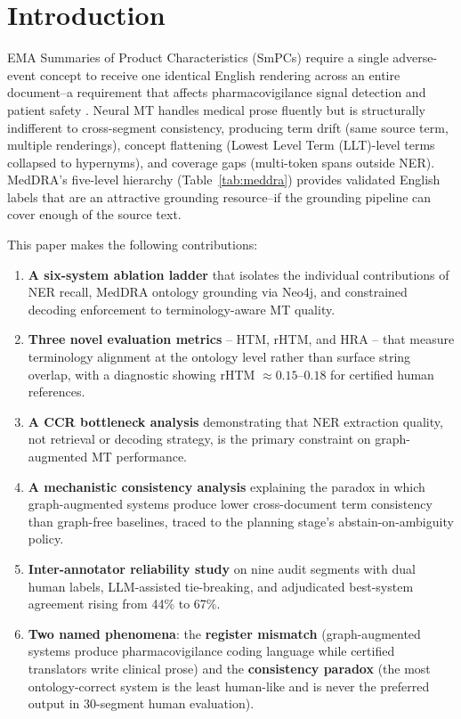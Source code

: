 \documentclass[11pt,a4paper,twocolumn]{article}
\begin{document}
\section{Introduction}
\label{sec:intro}

EMA Summaries of Product Characteristics (SmPCs) require a single
adverse-event concept to receive one identical English rendering across an
entire document--a requirement that affects pharmacovigilance signal detection
and patient safety \citep{neves2022evaluation}. Neural MT handles medical prose
fluently but is structurally indifferent to cross-segment consistency,
producing term drift (same source term, multiple renderings), concept
flattening (Lowest Level Term (LLT)-level terms collapsed to hypernyms), and coverage gaps
(multi-token spans outside NER). MedDRA's five-level hierarchy
(Table~\ref{tab:meddra}) provides validated English labels that are an
attractive grounding resource--if the grounding pipeline can cover enough of
the source text.

\noindent This paper makes the following contributions:

\begin{enumerate}[leftmargin=*, itemsep=4pt]

  \item \textbf{A six-system ablation ladder} that isolates the individual
  contributions of NER recall, MedDRA ontology grounding via Neo4j, and
  constrained decoding enforcement to terminology-aware MT quality.

  \item \textbf{Three novel evaluation metrics} -- HTM, rHTM, and HRA -- that
  measure terminology alignment at the ontology level rather than surface
  string overlap, with a diagnostic showing rHTM $\approx 0.15$--$0.18$ for
  certified human references.

  \item \textbf{A CCR bottleneck analysis} demonstrating that NER extraction
  quality, not retrieval or decoding strategy, is the primary constraint on
  graph-augmented MT performance.

  \item \textbf{A mechanistic consistency analysis} explaining the paradox in
  which graph-augmented systems produce lower cross-document term consistency
  than graph-free baselines, traced to the planning stage's
  abstain-on-ambiguity policy.

  \item \textbf{Inter-annotator reliability study} on nine audit segments with
  dual human labels, LLM-assisted tie-breaking, and adjudicated best-system
  agreement rising from 44\% to 67\%.

  \item \textbf{Two named phenomena}: the \textbf{register mismatch}
  (graph-augmented systems produce pharmacovigilance coding language while
  certified translators write clinical prose) and the \textbf{consistency
  paradox} (the most ontology-correct system is the least human-like and
  is never the preferred output in 30-segment human evaluation).

\end{enumerate}
\end{document}
